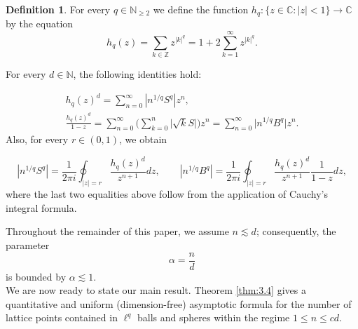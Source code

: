\documentclass[a4paper,twoside, reqno]{amsart}
\numberwithin{equation}{section}
\theoremstyle{definition}%
\theoremstyle{definition}
\newtheorem{Defn}[Thm]{Definition}
\theoremstyle{definition}%
\theoremstyle{definition}
\newcommand{\Z}{\mathbb{Z}}
\newcommand{\N}{\mathbb{N}}
\begin{document}
\begin{Defn}
    \label{def:3.3}
For every $q\in\N_{\geq 2}$ we define the function $h_q : \{ z \in \mathbb{C}: |z|<1 \} \to \mathbb{C}$ by the equation
\[
h_q(z)= \sum_{k \in \Z} z^{|k|^q}=1+2 \sum_{k=1}^{\infty} z^{|k|^q}.
\]
\end{Defn}
\noindent For every $d \in \N$, the following identities hold:

\begin{gather*}
h_q(z)^d 
= \sum_{n=0}^{\infty} |n^{1/q}S^q | z^n, \\
\frac{h_q(z)^d}{1-z}
= \sum_{n=0}^\infty \Big( \sum_{k=0}^n \big|\sqrt{k}S \big| \Big)z^n= \sum_{n=0}^{\infty} \big|n^{1/q}B^q\big| z^n.
\end{gather*}
Also, for every $r\in(0,1)$, we obtain
 
\begin{equation}
\label{eq:Cauchyball}
|n^{1/q}S^q|= \frac{1}{2 \pi i} \oint_{|z|=r} \frac{h_q(z)^d}{z^{n+1}} dz,\qquad|n^{1/q}B^q|= \frac{1}{2 \pi i} \oint_{|z|=r} \frac{h_q(z)^d}{z^{n+1}}\frac{1}{1-z} dz,
\end{equation}
where the last two equalities above follow from the application of Cauchy's integral formula.

Throughout the remainder of this paper, we assume $n\lesssim d$; consequently, the parameter
\[ \alpha=\frac{n}{d}\]
is bounded by $\alpha\lesssim 1.$ 
\\
We are now ready to state our main result. Theorem \ref{thm:3.4} gives a quantitative and uniform (dimension-free) asymptotic formula for the number of lattice points contained in $\ell^q$ balls and spheres within the regime $1 \leq n \leq c d.$
\end{document}
